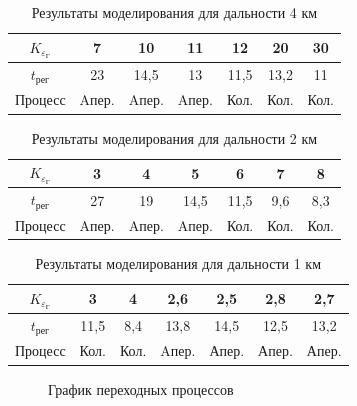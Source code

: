 \begin{table}[H]
    \centering
    \caption{Результаты моделирования для дальности 4 км}
    \begin{tabular}{c|c|c|c|c|c|c}
    \hline
        $K_{\varepsilon_\text{Г}}$& 7  & 10 & \cellcolor{cyan}11 & 12 & 20 &30\\ \hline
        $t_\text{рег}$& 23 & 14,5 & \cellcolor{cyan}13 & 11,5 & 13,2 &11\\ \hline
        Процесс& Aпер. & Aпер. & \cellcolor{cyan}Aпер. & Кол. & Кол. &Кол.\\ \hline
    \end{tabular}
    \label{tab:10KM}
\end{table}

\begin{table}[H]
    \centering
    \caption{Результаты моделирования для дальности 2 км}
    \begin{tabular}{c|c|c|c|c|c|c}
    \hline
        $K_{\varepsilon_\text{Г}}$& 3  & 4 & \cellcolor{cyan}5 & 6 & 7 &8\\ \hline
        $t_\text{рег}$& 27 & 19 & \cellcolor{cyan}14,5 & 11,5 & 9,6 &8,3\\ \hline
        Процесс& Aпер. & Aпер. &\cellcolor{cyan} Aпер. & Кол. & Кол. &Кол.\\ \hline
    \end{tabular}
    \label{tab:10KM}
\end{table}

\begin{table}[H]
    \centering
    \caption{Результаты моделирования для дальности 1 км}
    \begin{tabular}{c|c|c|c|c|c|c}
    \hline
        $K_{\varepsilon_\text{Г}}$& 3 & 4 & 2,6 & 2,5 & \cellcolor{cyan}2,8 &2,7\\ \hline
        $t_\text{рег}$& 11,5& 8,4& 13,8 & 14,5 & \cellcolor{cyan}12,5 &13,2\\ \hline
        Процесс& Кол. & Кол. & Aпер. & Апер. & \cellcolor{cyan}Апер. &Апер.\\ \hline
    \end{tabular}
    \label{tab:10KM}
\end{table}

\begin{figure}[H]
    \centering
    \caption{График переходных процессов}
    \label{fig:steps}
\end{figure}


